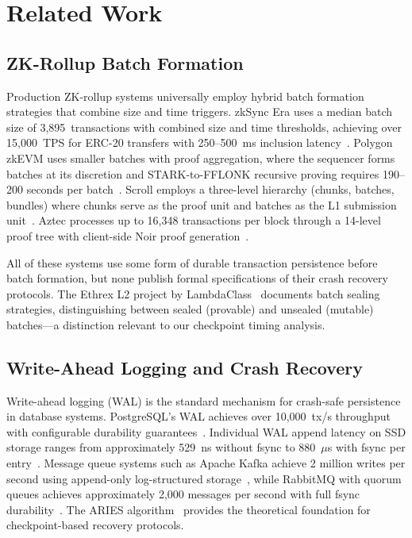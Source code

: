 
\section{Related Work}

\subsection{ZK-Rollup Batch Formation}

Production ZK-rollup systems universally employ hybrid batch formation strategies
that combine size and time triggers. zkSync Era uses a median batch size of
3,895~transactions with combined size and time thresholds, achieving over
15,000~TPS for ERC-20 transfers with 250--500~ms inclusion
latency~\cite{chaliasos2024analyzing}. Polygon zkEVM uses smaller batches with
proof aggregation, where the sequencer forms batches at its discretion and
STARK-to-FFLONK recursive proving requires 190--200 seconds per
batch~\cite{chaliasos2024analyzing}. Scroll employs a three-level hierarchy
(chunks, batches, bundles) where chunks serve as the proof unit and batches
as the L1 submission unit~\cite{scroll2025architecture}. Aztec processes up to
16,348 transactions per block through a 14-level proof tree with client-side
Noir proof generation~\cite{aztec2025ignition}.

All of these systems use some form of durable transaction persistence before batch
formation, but none publish formal specifications of their crash recovery protocols.
The Ethrex L2 project by LambdaClass~\cite{ethrex2024approach} documents batch
sealing strategies, distinguishing between sealed (provable) and unsealed
(mutable) batches---a distinction relevant to our checkpoint timing analysis.

\subsection{Write-Ahead Logging and Crash Recovery}

Write-ahead logging (WAL) is the standard mechanism for crash-safe persistence in
database systems. PostgreSQL's WAL achieves over 10,000~tx/s throughput with
configurable durability guarantees~\cite{postgresql2024wal}. Individual WAL
append latency on SSD storage ranges from approximately 529~ns without fsync to
880~$\mu$s with fsync per entry~\cite{chia2024database}. Message queue systems
such as Apache Kafka achieve 2 million writes per second using append-only
log-structured storage~\cite{linkedin2024kafka}, while RabbitMQ with quorum
queues achieves approximately 2,000 messages per second with full fsync
durability~\cite{softwaremill2020mq}. The ARIES algorithm~\cite{mohan1992aries}
provides the theoretical foundation for checkpoint-based recovery protocols.

